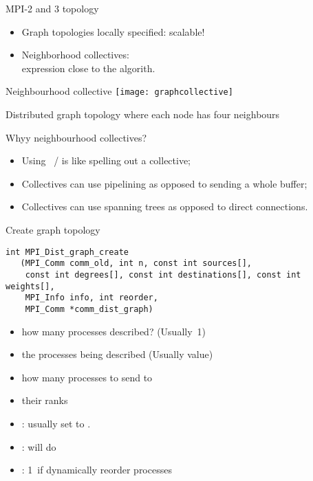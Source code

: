\begin{frame}[containsverbatim]{MPI-2  and 3 topology}
  \begin{itemize}
  \item Graph topologies locally specified: scalable!
  \item Neighborhood collectives:\\
    expression close to the algorith.
  \end{itemize}
\end{frame}

\begin{frame}{Neighbourhood collective}
  \label{fig:graphcollective}
  \texttt{[image: graphcollective]}

  Distributed graph topology where each
  node has four neighbours
\end{frame}

\begin{frame}[containsverbatim]{Whyy neighbourhood collectives?}
  \begin{itemize}
  \item Using ~/  is like spelling out a collective;
  \item Collectives can use pipelining as opposed to sending a whole
    buffer;
  \item Collectives can use spanning trees as opposed to direct connections.
  \end{itemize}
\end{frame}

\begin{frame}[containsverbatim]{Create graph topology}
\lstset{language=C}
\begin{lstlisting}
int MPI_Dist_graph_create
   (MPI_Comm comm_old, int n, const int sources[],
    const int degrees[], const int destinations[], const int weights[],
    MPI_Info info, int reorder,
    MPI_Comm *comm_dist_graph)
\end{lstlisting}
\begin{itemize}
\item {} how many processes described? (Usually~1)
\item {} the processes being described (Usually
   value)
\item {} how many processes to send to
\item {} their ranks
\item {}: usually set to .
\item {}:  will do
\item {}: 1~if dynamically reorder processes
\end{itemize}
\end{frame}

